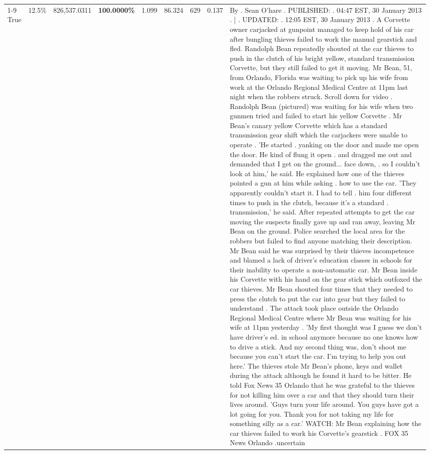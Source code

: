 \begin{table}[H]
\begin{tabular}{lllrlllll}
\cline{1-9} \cline{2-9}
True & 12.5\% & 826,537.0311 & \bfseries \color{red} 100.0000\% & 1.099 & 86.324 & 629 & 0.137 & By . Sean O'hare . PUBLISHED: . 04:47 EST, 30 January 2013 . | . UPDATED: . 12:05 EST, 30 January 2013 . A Corvette owner carjacked at gunpoint managed to keep hold of his car after bungling thieves failed to work the manual gearstick and fled. Randolph Bean repeatedly shouted at the car thieves to push in the clutch of his bright yellow, standard transmission Corvette, but they still failed to get it moving. Mr Bean, 51, from Orlando, Florida was waiting to pick up his wife from work at the Orlando Regional Medical Centre at 11pm last night when the robbers struck. Scroll down for video . Randolph Bean (pictured) was waiting for his wife when two gunmen tried and failed to start his yellow Corvette . Mr Bean's canary yellow Corvette which has a standard transmission gear shift which the carjackers were unable to operate . 'He started . yanking on the door and made me open the door. He kind of flung it open . and dragged me out and demanded that I get on the ground... face down, . so I couldn't look at him,' he said. He explained how one of the thieves pointed a gun at him while asking . how to use the car. 'They apparently couldn't start it. I had to tell . him four different times to push in the clutch, because it's a standard . transmission,' he said. After repeated attempts to get the car moving the suspects finally gave up and ran away, leaving Mr Bean on the ground. Police searched the local area for the robbers but failed to find anyone matching their description. Mr Bean said he was surprised by their thieves incompetence and blamed a lack of driver's education classes in schools for their inability to operate a non-automatic car. Mr Bean inside his Corvette with his hand on the gear stick which outfoxed the car thieves. Mr Bean shouted four times that they needed to press the clutch to put the car into gear but they failed to understand . The attack took place outside the Orlando Regional Medical Centre where Mr Bean was waiting for his wife at 11pm yesterday . 'My first thought was I guess we don't have driver's ed. in school anymore because no one knows how to drive a stick. And my second thing was, don't shoot me because you can't start the car. I'm trying to help you out here.' The thieves stole Mr Bean's phone, keys and wallet during the attack although he found it hard to be bitter. He told Fox News 35 Orlando that he was grateful to the thieves for not killing him over a car and that they should turn their lives around. 'Guys turn your life around. You guys have got a lot going for you. Thank you for not taking my life for something silly as a car.' WATCH: Mr Bean explaining how the car thieves failed to work his Corvette's gearstick . FOX 35 News Orlando .uncertain \\

\end{tabular}
\end{table}
